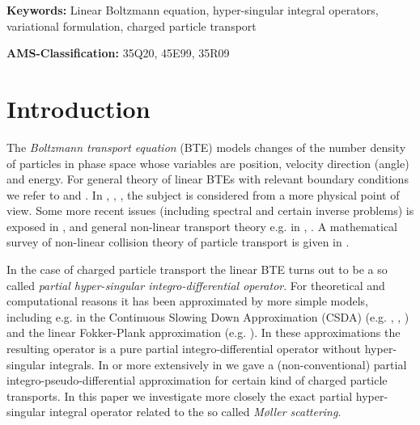 \documentclass[a4paper,12pt,oneside,reqno]{amsart}
\newcommand{\obs}[1]{{\bf  \textrm{#1} }}
\theoremstyle{theorem}
\begin{document}
{\small \textbf{Keywords: } Linear Boltzmann equation,  hyper-singular integral operators, variational formulation, charged particle transport}

{\small \textbf {AMS-Classification:}  35Q20, 45E99, 35R09}
  

\section{Introduction}\label{intro}

 

The \emph{Boltzmann transport equation} (BTE) models changes of the number density of particles in phase space whose variables are position, velocity direction (angle) and energy.
For general theory of linear BTEs with relevant boundary conditions we refer to \cite{dautraylionsv6} and \cite{agoshkov}. In \cite{case}, \cite{cercignani}, \cite{duderstadt}, \cite{pomraning}  the subject is considered from a more physical point of view.
Some more recent issues (including spectral and certain inverse problems) is exposed in \cite{mokhtarkharroubi},
and  general non-linear transport theory e.g. in \cite{ukai}, \cite{bellamo}.
A  mathematical survey of non-linear collision theory of particle transport 
is given in \cite{villani}. 


In the case of charged particle transport the linear BTE turns out to be a so called \emph{partial hyper-singular  integro-differential operator}. For theoretical and computational reasons it has  been approximated by more simple models, including e.g. in the Continuous Slowing Down Approximation (CSDA) (e.g. \cite{wilson}, \cite{frank10}, \cite{tervo18-up}) and the linear Fokker-Plank approximation
(e.g. \cite{pomraning92}). In these approximations the resulting operator is  a pure partial integro-differential operator without hyper-singular integrals. In \cite{tervo18} or more extensively in \cite{tervo18-up} we gave a (non-conventional) partial integro-pseudo-differential approximation for  certain kind of charged particle transports. In this paper we investigate more closely the exact partial hyper-singular integral operator related to the so called \emph{M\o ller scattering}. 
\end{document}
